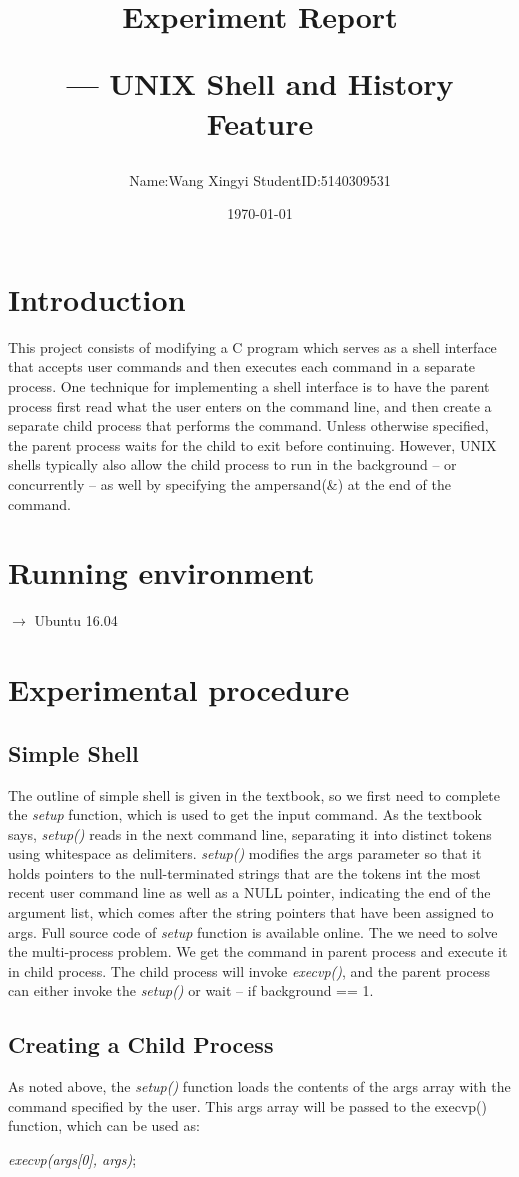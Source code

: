 \documentclass[a4paper, 11pt]{article}
\title{Experiment Report \\ \begin{large}--- UNIX Shell and History Feature\end{large}}
\author{Name:Wang Xingyi StudentID:5140309531}
\date{\today}
\begin{document}
\maketitle
\section{Introduction}
This project consists of modifying a C program which serves as a shell interface that accepts user commands and then executes each command in a separate process. One technique for implementing a shell interface is to have the parent process first read what the user enters on the command line, and then create a separate child process that performs the command. Unless otherwise specified, the parent process waits for the child to exit before continuing. However, UNIX shells typically also allow the child process to run in the background -- or concurrently -- as well by specifying the ampersand(\&) at the end of the command.
\section{Running environment}
$\longrightarrow$ Ubuntu 16.04
\section{Experimental procedure}
\subsection{Simple Shell}
The outline of simple shell is given in the textbook, so we first need to complete the \emph{setup} function, which is used to get the input command. As the textbook says, \emph{setup()} reads in the next command line, separating it into distinct tokens using whitespace as delimiters. \emph{setup()} modifies the args parameter so that it holds pointers to the null-terminated strings that are the tokens int the most recent user command line as well as a NULL pointer, indicating the end of the argument list, which comes after the string pointers that have been assigned to args. Full source code of \emph{setup} function is available online. The we need to solve the multi-process problem. We get the command in parent process and execute it in child process. The child process will invoke \emph{execvp()}, and the parent process can either invoke the \emph{setup()} or wait -- if background == 1.
\subsection{Creating a Child Process}
As noted above, the \emph{setup()} function loads the contents of the args array with the command specified by the user. This args array will be passed to the execvp() function, which can be used as:
\par\emph{execvp(args[0], args)};
\end{document}
